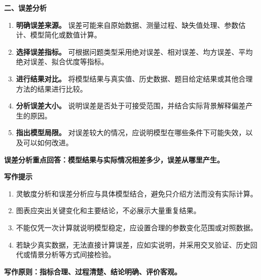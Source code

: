 \textbf{二、误差分析}
\begin{enumerate}[label=(\arabic*), leftmargin=2.5em, itemsep=0.3em]
\item \textbf{明确误差来源。} 误差可能来自原始数据、测量过程、缺失值处理、参数估计、模型简化或数值计算。

\item \textbf{选择误差指标。} 可根据问题类型采用绝对误差、相对误差、均方误差、平均绝对误差、拟合优度等指标。

\item \textbf{进行结果对比。} 将模型结果与真实值、历史数据、题目给定结果或其他合理方法的结果进行比较。

\item \textbf{分析误差大小。} 说明误差是否处于可接受范围，并结合实际背景解释偏差产生的原因。

\item \textbf{指出模型局限。} 对误差较大的情况，应说明模型在哪些条件下可能失效，以及可以如何改进。
\end{enumerate}
\hspace*{\parindent} \textbf{误差分析重点回答：模型结果与实际情况相差多少，误差从哪里产生。}

\textbf{写作提示}
\begin{enumerate}[label=(\arabic*), leftmargin=2.5em, itemsep=0.3em]
\item 灵敏度分析和误差分析应与具体模型结合，避免只介绍方法而没有实际计算。

\item 图表应突出关键变化和主要结论，不必展示大量重复结果。

\item 不能仅凭一次计算就说明模型稳定，应设置合理的参数变化范围或对照数据。

\item 若缺少真实数据，无法直接计算误差，应如实说明，并采用交叉验证、历史回代或情景分析等方式间接检验。
\end{enumerate}
\hspace*{\parindent} \textbf{写作原则：指标合理、过程清楚、结论明确、评价客观。}
